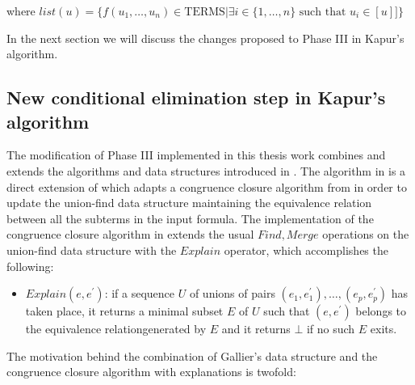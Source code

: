 where $list(u) = \{ f(u_1, \dots, u_n) \in \text{TERMS} 
| \exists i \in \{1, \dots, n\} \text{ such that } u_i \in [u] ] \}$

In the next section we will discuss the changes proposed to 
Phase III in Kapur's algorithm. 

\subsection{New conditional elimination 
step in Kapur's algorithm}

The modification of Phase III implemented in this thesis work
combines and extends the algorithms and data structures introduced
in \cite{GALLIER1987233, 10.1007/978-3-540-32033-3_33}.
The algorithm in \cite{GALLIER1987233} is a direct
extension of \cite{DOWLING1984267} which adapts a 
congruence closure algorithm from 
\cite{10.1145/322186.322198, 10.1145/322217.322228} in order
to update the union-find data structure maintaining the
equivalence relation between all the subterms in the input
formula. The implementation of the congruence closure
algorithm in \cite{10.1007/978-3-540-32033-3_33}
extends the usual $Find, Merge$ operations on the 
union-find data structure with the $Explain$ operator, 
which accomplishes the following:

\begin{itemize} \label{explain_def}
  \item[] $Explain(e, e^{'})$: if a sequence $U$ of
    unions of pairs $(e_1, e_1^{'}), \dots, (e_p, e_p^{'})$
    has taken place, it returns a minimal subset $E$
    of $U$ such that $(e, e^{'})$ belongs to the equivalence
    relationgenerated by $E$ and it returns $\bot$
    if no such $E$ exits.
\end{itemize}

The motivation behind the combination of 
Gallier's data structure and the congruence 
closure algorithm with explanations is twofold: 

